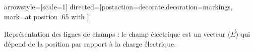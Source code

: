 
\tikzstyle arrowstyle=[scale=1] %
\tikzstyle directed=[postaction={decorate,decoration={markings,
mark=at position .65 with {}}}]%


\begin{minipage}[c]{.45\linewidth}
\begin{center}
Représentation des lignes de champs : le champ électrique est un vecteur ($\overrightarrow{E}$) qui dépend de la position par rapport à la charge électrique.
\end{center}
\end{minipage}
\hfill
\begin{minipage}[c]{.45\linewidth}
\end{minipage}

